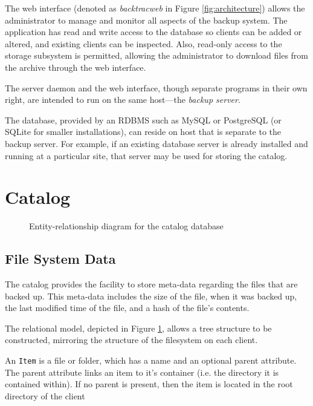 The web interface (denoted as \emph{backtracweb} in Figure
\ref{fig:architecture}) allows the administrator to manage and monitor all
aspects of the backup system. The application has read and write access to the
database so clients can be added or altered, and existing clients can be
inspected. Also, read-only access to the storage subsystem is permitted,
allowing the administrator to download files from the archive through the web
interface.

The server daemon and the web interface, though separate programs in their own
right, are intended to run on the same host---the \emph{backup server}.

The database, provided by an RDBMS such as MySQL or PostgreSQL (or SQLite for
smaller installations), can reside on host that is separate to the backup
server. For example, if an existing database server is already installed and
running at a particular site, that server may be used for storing the catalog.

\section{Catalog}

\begin{figure}
    \begin{center}
        \newlength{\svgwidth}
        \setlength{\svgwidth}{1.1\textwidth}
        \tiny
        
    \end{center}
    \caption{Entity-relationship diagram for the catalog database}
    \label{fig:erd}
\end{figure}

\subsection{File System Data}

The catalog provides the facility to store meta-data regarding the files that
are backed up. This meta-data includes the size of the file, when it was backed
up, the last modified time of the file, and a hash of the file's contents.

The relational model, depicted in Figure \ref{fig:erd}, allows a tree structure
to be constructed, mirroring the structure of the filesystem on each client.

An \verb!Item! is a file or folder, which has a name and an optional parent
attribute. The parent attribute links an item to it's container (i.e. the
directory it is contained within). If no parent is present, then the item is
located in the root directory of the client


